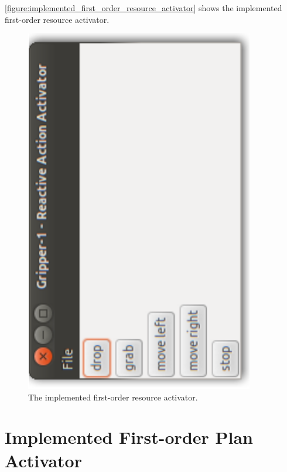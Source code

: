 {\mbox{\autoref{figure:implemented_first_order_resource_activator}}}
shows the implemented first-order resource activator.
\begin{figure}
\includegraphics[width=10cm]{gfx/implemented_first_order_resource_activator}
\caption[The implemented first-order resource activator.]{The
  implemented first-order resource activator.}
\label{figure:implemented_first_order_resource_activator}
\end{figure}

\section{Implemented First-order Plan Activator}

